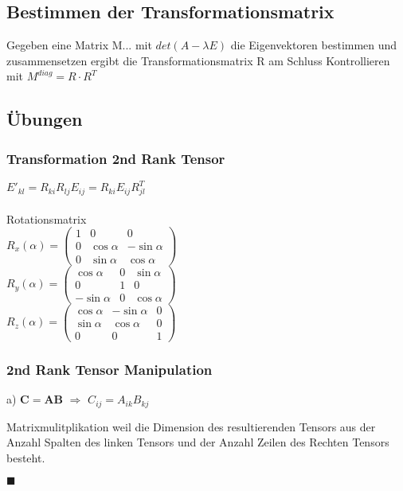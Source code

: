 \documentclass[a4paper]{scrartcl}
\begin{document}
\subsection{Bestimmen der Transformationsmatrix}

Gegeben eine Matrix M... mit $det(A-\lambda E)$ die Eigenvektoren bestimmen und zusammensetzen ergibt die Transformationsmatrix R am Schluss Kontrollieren mit $M^{diag}=R \cdot R^T$



\subsection{Übungen}
\subsubsection{Transformation 2nd Rank Tensor}
$E'_{kl}=R_{ki}R_{lj}E_{ij}=R_{ki}E_{ij}R_{jl}^T$
\\
\\
Rotationsmatrix
\\
$R_x(\alpha) = \begin{pmatrix} 
1 &   0         & 0           \\
0 & \cos \alpha & -\sin \alpha \\
0 & \sin \alpha &  \cos \alpha
\end{pmatrix} $
\\
$R_y(\alpha) = \begin{pmatrix} 
\cos \alpha  & 0 & \sin \alpha \\
   0         & 1 &  0          \\
-\sin \alpha & 0 & \cos \alpha
\end{pmatrix} $
\\
$R_z(\alpha) = \begin{pmatrix} 
\cos \alpha & -\sin \alpha & 0 \\
\sin \alpha &  \cos \alpha & 0 \\            
   0        &  0           & 1
\end{pmatrix}$
\\

\subsubsection{2nd Rank Tensor Manipulation}

a) $\mathbf{C}=\mathbf{AB}$ $\Rightarrow$ $C_{ij}=A_{ik}B_{kj}$

Matrixmulitplikation weil die Dimension des resultierenden Tensors aus der
Anzahl Spalten des linken Tensors und der Anzahl Zeilen des Rechten Tensors
besteht. \begin{flushright} $\blacksquare$ \end{flushright}
\end{document}
